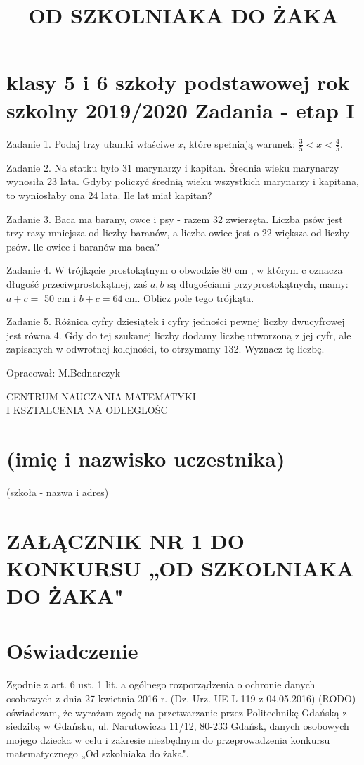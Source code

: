 \documentclass[10pt]{article}
\title{OD SZKOLNIAKA DO ŻAKA }
\author{}
\date{}
\begin{document}
\maketitle
\section*{klasy 5 i 6 szkoły podstawowej rok szkolny 2019/2020 Zadania - etap I}
Zadanie 1. Podaj trzy ułamki właściwe \(x\), które spełniają warunek: \(\frac{3}{5}<x<\frac{4}{5}\).

Zadanie 2. Na statku było 31 marynarzy i kapitan. Średnia wieku marynarzy wynosiła 23 lata. Gdyby policzyć średnią wieku wszystkich marynarzy i kapitana, to wyniosłaby ona 24 lata. Ile lat miał kapitan?

Zadanie 3. Baca ma barany, owce i psy - razem 32 zwierzęta. Liczba psów jest trzy razy mniejsza od liczby baranów, a liczba owiec jest o 22 większa od liczby psów. lle owiec i baranów ma baca?

Zadanie 4. W trójkącie prostokątnym o obwodzie 80 cm , w którym c oznacza długość przeciwprostokątnej, zaś \(a, b\) są długościami przyprostokątnych, mamy: \(a+c=\) 50 cm i \(b+c=64 \mathrm{~cm}\). Oblicz pole tego trójkąta.

Zadanie 5. Różnica cyfry dziesiątek i cyfry jedności pewnej liczby dwucyfrowej jest równa 4. Gdy do tej szukanej liczby dodamy liczbę utworzoną z jej cyfr, ale zapisanych w odwrotnej kolejności, to otrzymamy 132. Wyznacz tę liczbę.

Opracował: M.Bednarczyk

CENTRUM NAUCZANIA MATEMATYKI\\
I KSZTALCENIA NA ODLEGLOŚC

\section*{(imię i nazwisko uczestnika)}
\(\qquad\)\\
(szkoła - nazwa i adres)

\section*{ZAŁĄCZNIK NR 1 DO KONKURSU „OD SZKOLNIAKA DO ŻAKA"}
\section*{Oświadczenie}
Zgodnie z art. 6 ust. 1 lit. a ogólnego rozporządzenia o ochronie danych osobowych z dnia 27 kwietnia 2016 r. (Dz. Urz. UE L 119 z 04.05.2016) (RODO) oświadczam, że wyrażam zgodę na przetwarzanie przez Politechnikę Gdańską z siedzibą w Gdańsku, ul. Narutowicza 11/12, 80-233 Gdańsk, danych osobowych mojego dziecka w celu i zakresie niezbędnym do przeprowadzenia konkursu matematycznego „Od szkolniaka do żaka".
\end{document}

